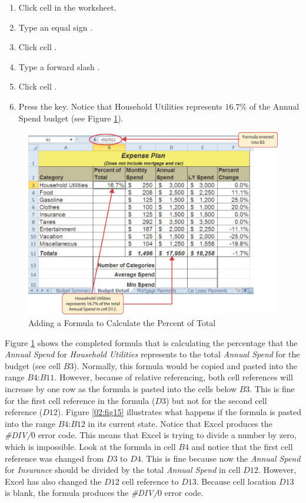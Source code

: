 \begin{enumerate}
	\item Click cell  in the  worksheet.
	\item Type an equal sign \fmtTyping{=}.
	\item Click cell .
	\item Type a forward slash \fmtTyping{/}.
	\item Click cell .
	\item Press the  key. Notice that Household Utilities represents $ 16.7$\% of the Annual Spend budget (see Figure \ref{02:fig14}).
\end{enumerate}

\begin{figure}[H]
	\centering
	\includegraphics[width=\maxwidth{.95\linewidth}]{gfx/ch02_fig14}
	\caption{Adding a Formula to Calculate the Percent of Total}
	\label{02:fig14}
\end{figure}

Figure \ref{02:fig14} shows the completed formula that is calculating the percentage that the \textit{Annual Spend} for \textit{Household Utilities}  represents to the total \textit{Annual Spend} for the budget (see cell \textit{$ B3 $}). Normally, this formula would be copied and pasted into the range $ B4 $:$ B11 $. However, because of relative referencing, both cell references will increase by one row as the formula is pasted into the cells below $ B3 $. This is fine for the first cell reference in the formula ($ D3 $) but not for the second cell reference ($ D12 $). Figure \ref{02:fig15} illustrates what happens if the formula is pasted into the range $ B4 $:$ B12 $ in its current state. Notice that Excel produces the \textit{\#DIV/$ 0 $} error code. This means that Excel is trying to divide a number by zero, which is impossible. Look at the formula in cell $ B4 $ and notice that the first cell reference was changed from $ D3 $ to $ D4 $. This is fine because now the \textit{Annual Spend} for \textit{Insurance} should be divided by the total \textit{Annual Spend} in cell $ D12 $. However, Excel has also changed the $ D12 $ cell reference to $ D13 $. Because cell location $ D13 $ is blank, the formula produces the \textit{\#DIV/$ 0 $} error code.


